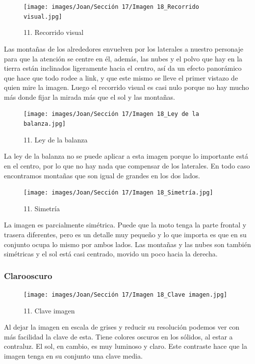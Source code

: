 \documentclass[12pt]{article}
\begin{document}
        \begin{figure}[H]
          \centering
          \texttt{[image: images/Joan/Sección 17/Imagen 18\_Recorrido visual.jpg]}
          \caption{\small 11. Recorrido visual}
        \end{figure}
        Las montañas de los alrededores envuelven por los laterales a nuestro personaje para que la atención se centre en él, además, las nubes y el polvo que hay en la tierra están inclinados ligeramente hacia el centro, así da un efecto panorámico que hace que todo rodee a link, y que este mismo se lleve el primer vistazo de quien mire la imagen. 
    Luego el recorrido visual es casi nulo porque no hay mucho más donde fijar la mirada más que el sol y las montañas. 

    \begin{figure}[H]
          \centering
          \texttt{[image: images/Joan/Sección 17/Imagen 18\_Ley de la balanza.jpg]}
          \caption{\small 11. Ley de la balanza}
        \end{figure}
        La ley de la balanza no se puede aplicar a esta imagen porque lo importante está en el centro, por lo que no hay nada que compensar de los laterales. En todo caso encontramos montañas que son igual de grandes en los dos lados. 

    \begin{figure}[H]
          \centering
          \texttt{[image: images/Joan/Sección 17/Imagen 18\_Simetría.jpg]}
          \caption{\small 11. Simetría}
        \end{figure}
        La imagen es parcialmente simétrica. Puede que la moto tenga la parte frontal y trasera diferentes, pero es un detalle muy pequeño y lo que importa es que en su conjunto ocupa lo mismo por ambos lados. Las montañas y las nubes son también simétricas y el sol está casi centrado, movido un poco hacia la derecha. 

            \subsubsection{Clarooscuro}
            \begin{figure}[H]
          \centering
          \texttt{[image: images/Joan/Sección 17/Imagen 18\_Clave imagen.jpg]}
          \caption{\small 11. Clave imagen}
        \end{figure}
        Al dejar la imagen en escala de grises y reducir su resolución podemos ver con más facilidad la clave de esta. Tiene colores oscuros en los sólidos, al estar a contraluz. El sol, en cambio, es muy luminoso y claro. Este contraste hace que la imagen tenga en su conjunto una clave media. 
\end{document}
